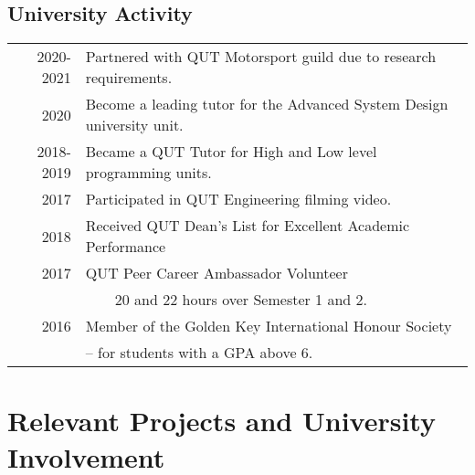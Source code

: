 \documentclass[a4paper,12pt]{article}
\newcommand{\tabitem}{~~\llap{\textbullet}~~}
\begin{document}
{{\begin{tabular}{r|p{11cm}}
\end{tabular}
    } {}
{
    {
\subsection{University Activity}
	\begin{tabular}{rl}
		\textsc{2020-2021} & Partnered with QUT Motorsport guild due to research requirements. \\	
		\textsc{2020} & Become a leading tutor for the Advanced System Design university unit. \\	
		\textsc{2018-2019} & Became a QUT Tutor for High and Low level programming units. \\
		\textsc{2017} & Participated in QUT Engineering filming video. \\
		\textsc{2018} & Received QUT Dean's List for Excellent Academic Performance \\
		\textsc{2017} & QUT Peer Career Ambassador Volunteer \\ 
		    & \tabitem 20 and 22 hours over Semester 1 and 2. \\
		\textsc{2016} & Member of the Golden Key International Honour Society \\&– for students with a GPA above 6. %
	\end{tabular}
	} {}
}
{}
\section{Relevant Projects and University Involvement}
}
\end{document}
